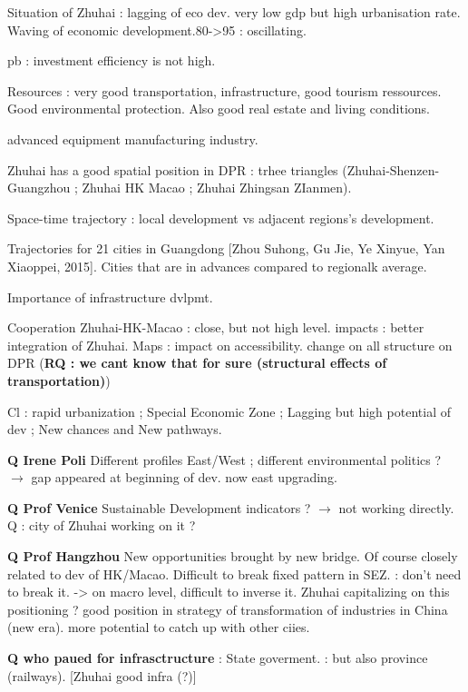 Situation of Zhuhai : lagging of eco dev. very low gdp but high urbanisation rate. Waving of economic development.80->95 : oscillating.

pb : investment efficiency is not high.

Resources : very good transportation, infrastructure, good tourism ressources. Good environmental protection. Also good real estate and living conditions.

advanced equipment manufacturing industry.

Zhuhai has a good spatial position in DPR : trhee triangles (Zhuhai-Shenzen-Guangzhou ; Zhuhai HK Macao ; Zhuhai Zhingsan ZIanmen).

Space-time trajectory : local development vs adjacent regions's development. 

Trajectories for 21 cities in Guangdong [Zhou Suhong, Gu Jie, Ye Xinyue, Yan Xiaoppei, 2015]. Cities that are in advances compared to regionalk average.

Importance of infrastructure dvlpmt.

Cooperation Zhuhai-HK-Macao : close, but not high level.
impacts : better integration of Zhuhai.
Maps : impact on accessibility. change on all structure on DPR (\textbf{RQ : we cant know that for sure (structural effects of transportation)})

Cl : rapid urbanization ; Special Economic Zone ; Lagging but high potential of dev ; New chances and New pathways.

\textbf{Q Irene Poli} Different profiles East/West ; different environmental politics ? $\rightarrow$ gap appeared at beginning of dev. now east upgrading. 


\textbf{Q Prof Venice} Sustainable Development indicators ? $\rightarrow$ not working directly. Q : city of Zhuhai working on it ?

\textbf{Q Prof Hangzhou} New opportunities brought by new bridge. Of course closely related to dev of HK/Macao. Difficult to break fixed pattern in SEZ. : don't need to break it.
-> on macro level, difficult to inverse it. Zhuhai capitalizing on this positioning ? good position in strategy of transformation of industries in China (new era). more potential to catch up with other ciies. 

\textbf{Q who paued for infrasctructure} : State goverment. : but also province (railways). [Zhuhai good infra (?)]







